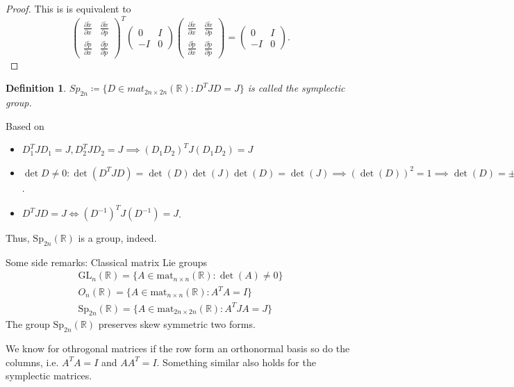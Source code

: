 \documentclass[hidelinks,a4paper, 11pt]{article}
\theoremstyle{plain}
\theoremstyle{break}
\theoremstyle{plain}
\newtheorem{definition}[theorem]{Definition}
\theoremstyle{definition}
\begin{document}
{\begin{proof}
	This is is equivalent to
	\[
	\begin{pmatrix}
	\frac{\partial \tilde x}{\partial x} & \frac{\partial \tilde x}{\partial p} \\
	\frac{\partial \tilde p}{\partial x} & \frac{\partial \tilde p}{\partial p}
	\end{pmatrix}^T \begin{pmatrix}
	0 & I \\ -I & 0
	\end{pmatrix} \begin{pmatrix}
	\frac{\partial \tilde x}{\partial x} & \frac{\partial \tilde x}{\partial p} \\
	\frac{\partial \tilde p}{\partial x} & \frac{\partial \tilde p}{\partial p}
	\end{pmatrix} = \begin{pmatrix}
	0 & I \\ -I & 0
	\end{pmatrix}.
	\]
\end{proof}
\begin{definition}
	$Sp_{2n} \coloneqq \{ D \in mat_{2n \times 2n} (\mathbb R): D^TJD = J \}$ is called the symplectic group.
\end{definition}

Based on 
\begin{itemize}
	\item $D_1^TJD_1 = J, D_2^TJD_2 = J \implies (D_1D_2)^T J (D_1D_2) = J$ 
	\item $\det D \neq 0: \det(D^TJD) = \det(D)\det(J)\det(D) = \det(J) \implies (\det(D))^2 = 1 \implies \det(D) = \pm1$.
	\item $D^TJD = J \iff (D^{-1})^TJ(D^{-1}) = J$.
\end{itemize} 
Thus, $\mathrm{Sp}_{2n}(\mathbb R)$ is a group, indeed.

Some side remarks: Classical matrix Lie groups
\begin{gather*}
\mathrm{GL}_n(\mathbb R) = \{ A \in \mathrm{mat}_{n \times n}(\mathbb R) : \det(A) \neq 0 \} \\
O_n(\mathbb R) = \{ A \in \mathrm{mat}_{n \times n}(\mathbb R): A^T A = I \} \\
\mathrm{Sp}_{2n}(\mathbb R) = \{ A \in \mathrm{mat}_{2n \times 2n}(\mathbb R): A^TJA = J \}
\end{gather*}
The group $\mathrm{Sp}_{2n}(\mathbb R)$ preserves skew symmetric two forms.

We know for othrogonal matrices if the row form an orthonormal basis so do the columns, i.e. $A^T A = I$ and $AA^T = I$. Something similar also holds for the symplectic matrices.

}
\end{document}
